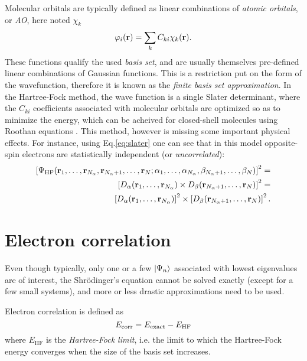 \documentclass[./thesis.tex]{subfiles}
\begin{document}
Molecular orbitals are typically defined as linear combinations of \emph{atomic orbitals}, or \emph{AO}, here noted $\chi_k$
\begin{equation}
 \varphi_i({\bf r}) = \sum_k C_{ki} \chi_k({\bf r}).
\end{equation}
These functions qualify the used \emph{basis set}, and are usually themselves pre-defined linear combinations of Gaussian functions. This is a restriction put on the form of the wavefunction, therefore it is known as the \emph{finite basis set approximation}.
In the Hartree-Fock method, the wave function is a single Slater determinant, where the $C_{ki}$ coefficients associated with molecular orbitals are optimized so as to minimize the energy, which can be acheived for closed-shell molecules using Roothan equations \cite{Roothaan_1951}. This method, however is missing some important physical effects. For instance, using Eq.\eqref{eq:slater} one can see that in this model opposite-spin electrons are statistically independent (or \emph{uncorrelated}):
\begin{equation}
\begin{split}
\left[ \Psi_\textrm{HF}({\bf r}_1,\dots,{\bf r}_{{N_\alpha}},{\bf r}_{{N_\alpha}+1},\dots,{\bf r}_N;
      \alpha_1,\dots,\alpha_{{N_\alpha}},\beta_{{N_\alpha}+1},\dots,\beta_N) \right]^2 = \\
\left[ D_\alpha({\bf r}_1,\dots,{\bf r}_{{N_\alpha}}) \times D_\beta({\bf r}_{{N_\alpha}+1},\dots,{\bf r}_N) \right]^2 = \\
\left[ D_\alpha({\bf r}_1,\dots,{\bf r}_{{N_\alpha}}) \right]^2 \times \left[ D_\beta({\bf r}_{{N_\alpha}+1},\dots,{\bf r}_N) \right]^2.
\end{split}
\end{equation}

\section{Electron correlation}
Even though typically, only one or a few $\ket{\Psi_n}$ associated with lowest eigenvalues are of interest, the Shrödinger's equation cannot be solved exactly (except for a few small systems), and more or less drastic approximations need to be used. 

Electron correlation is defined as\cite{Lowdin_1959}
\begin{equation}
E_\text{corr} = E_\text{exact} - E_\text{HF}
\end{equation}
where $E_\text{HF}$ is the \emph{Hartree-Fock limit}, i.e. the limit to which the Hartree-Fock energy converges when the size of the basis set increases.
\end{document}
